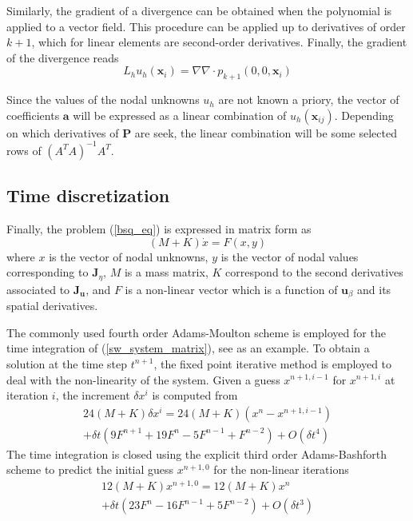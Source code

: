 Similarly, the gradient of a divergence can be obtained when the polynomial is applied to a vector field. This procedure can be applied up to derivatives of order $k+1$, which for linear elements are second-order derivatives. Finally, the gradient of the divergence reads
\begin{equation}
    L_h u_h (\mathbf{x}_i) = \nabla \nabla \cdot p_{k+1} (0,0,\mathbf{x}_i)
\end{equation}

Since the values of the nodal unknowns $u_h$ are not known a priory, the vector of coefficients $\mathbf{a}$ will be expressed as a linear combination of $u_h(\mathbf{x}_{ij})$. Depending on which derivatives of $\mathbf{P}$ are seek, the linear combination will be some selected rows of $(A^T A)^{-1}A^T$.




\subsection{Time discretization}

Finally, the problem (\ref{bsq_eq}) is expressed in matrix form as
\begin{equation} \label{sw_system_matrix}
    (M + K) \dot{x} = F(x,y)
\end{equation} 
where $x$ is the vector of nodal unknowns, $y$ is the vector of nodal values corresponding to $\mathbf{J}_\eta$, $M$ is a mass matrix, $K$ correspond to the second derivatives associated to $\mathbf{J}_{\mathbf{u}}$, and $F$ is a non-linear vector which is a function of $\mathbf{u}_\beta$ and its spatial derivatives.



The commonly used fourth order Adams-Moulton scheme is employed for the time integration of (\ref{sw_system_matrix}), see \cite{wei1995,woo2004a,codina2008b} as an example.
To obtain a solution at the time step $t^{n+1}$, the fixed point iterative method is employed to deal with the non-linearity of the system. Given a guess $x^{n+1,i-1}$ for $x^{n+1,i}$ at iteration $i$, the increment $\delta x^i$ is computed from
\begin{multline}
    24 (M + K) \delta x^i = 
    24 (M + K) (x^n - x^{n+1,i-1}) \\
     + \delta t (9F^{n+1} + 19F^n - 5F^{n-1} + F^{n-2}) + O(\delta t^4)
    \label{adams-moulton}
\end{multline}
The time integration is closed using the explicit third order Adams-Bashforth scheme to predict the initial guess $x^{n+1,0}$ for the non-linear iterations
\begin{multline}
    12 (M + K) x^{n+1,0} = 
    12 (M + K) x^n \\
     + \delta t (23F^n - 16F^{n-1} + 5F^{n-2}) + O(\delta t^3)
    \label{adams-bashforth}
\end{multline}

